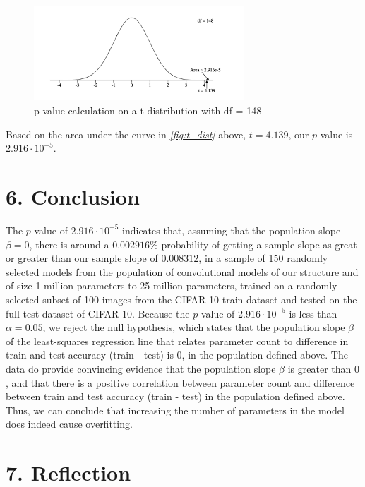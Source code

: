 \documentclass[12pt]{article}
\begin{document}
    \begin{figure}[H]
        \centering
        \includegraphics[width=0.7\textwidth]{Images/tdistribution}
        \caption{p-value calculation on a t-distribution with df = 148}
        \label{fig:t_dist}
    \end{figure}

    \noindent Based on the area under the curve in \textit{\autoref{fig:t_dist}} above, $t=4.139$, our $p$-value is $2.916\cdot10^{-5}$.

    \section*{6. Conclusion}

    The $p$-value of $2.916\cdot10^{-5}$ indicates that, assuming that the population slope $\beta=0$, there is around a
    $0.002916\%$ probability of getting a sample slope as great or greater than our sample slope of $0.008312$, in a sample of
    150 randomly selected models from the population of convolutional models of our structure and of size 1 million parameters to 25 million parameters, trained
    on a randomly selected subset of 100 images from the CIFAR-10 train dataset and tested on the full test dataset of CIFAR-10.
    Because the $p$-value of $2.916\cdot10^{-5}$ is less than $\alpha=0.05$, we reject the null hypothesis, which states that the population slope $\beta$
    of the least-squares regression line that relates parameter count to difference in train and test accuracy (train - test) is $0$,
    in the population defined above.
    The data do provide convincing evidence that the population slope $\beta$ is greater than $0$, and that there is a positive correlation between
    parameter count and difference between train and test accuracy (train - test) in the population defined above. Thus, we can conclude that
    increasing the number of parameters in the model does indeed cause overfitting.


    \section*{7. Reflection}
\end{document}
